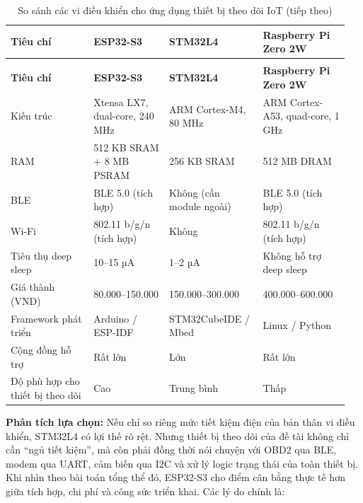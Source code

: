 \documentclass[a4paper]{extarticle}
\newcommand{\thesissettableid}[2]{%
  \renewcommand{\thetable}{#1}%
  \renewcommand{\theHtable}{#2}%
}
\begin{document}
{\thesissettableid{2.3}{tab-ch2-mcu-comparison-for-tracker}
\def\LTcaptype{table}
\begin{longtable}{|L{0.230\linewidth}|L{0.218\linewidth}|L{0.260\linewidth}|L{0.246\linewidth}|}
\caption{So sánh các vi điều khiển cho ứng dụng thiết bị theo dõi IoT}\label{tab:ch2-mcu-comparison-for-tracker}\\
\hline \textbf{Tiêu chí} & \textbf{ESP32-S3} & \textbf{STM32L4} & \textbf{Raspberry Pi Zero 2W} \\
\hline
\endfirsthead
\caption[]{So sánh các vi điều khiển cho ứng dụng thiết bị theo dõi IoT (tiếp theo)}\\
\hline \textbf{Tiêu chí} & \textbf{ESP32-S3} & \textbf{STM32L4} & \textbf{Raspberry Pi Zero 2W} \\
\hline
\endhead
\hline
\endfoot
\endlastfoot
Kiến trúc & Xtensa LX7, dual-core, 240 MHz & ARM Cortex-M4, 80 MHz & ARM
Cortex-A53, quad-core, 1 GHz \\\hline
RAM & 512 KB SRAM + 8 MB PSRAM & 256 KB SRAM & 512 MB DRAM \\\hline
BLE & BLE 5.0 (tích hợp) & Không (cần module ngoài) & BLE 5.0 (tích
hợp) \\\hline
Wi-Fi & 802.11 b/g/n (tích hợp) & Không & 802.11 b/g/n (tích hợp) \\\hline
Tiêu thụ deep sleep & 10--15 µA & 1--2 µA & Không hỗ trợ deep sleep \\\hline
Giá thành (VND) & 80.000--150.000 & 150.000--300.000 &
400.000--600.000 \\\hline
Framework phát triển & Arduino / ESP-IDF & STM32CubeIDE / Mbed & Linux /
Python \\\hline
Cộng đồng hỗ trợ & Rất lớn & Lớn & Rất lớn \\\hline
Độ phù hợp cho thiết bị theo dõi & Cao & Trung bình & Thấp \\\hline
\end{longtable}
}

\textbf{Phân tích lựa chọn:} Nếu chỉ so riêng mức tiết kiệm điện của bản
thân vi điều khiển, STM32L4 có lợi thế rõ rệt. Nhưng thiết bị theo dõi của đề tài
không chỉ cần ``ngủ tiết kiệm'', mà còn phải đồng thời nói chuyện với
OBD2 qua BLE, modem qua UART, cảm biến qua I2C và xử lý logic trạng
thái của toàn thiết bị. Khi nhìn theo bài toán tổng thể đó, ESP32-S3 cho
điểm cân bằng thực tế hơn giữa tích hợp, chi phí và công sức triển khai.
Các lý do chính là:
\end{document}
